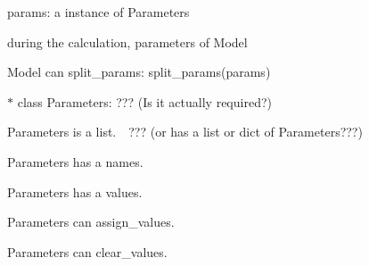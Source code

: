 \begin{DoxyItemize}
\begin{DoxyItemize}
\begin{DoxyItemize}
\begin{DoxyItemize}
\item params\+: a instance of {\ttfamily Parameters}
\begin{DoxyItemize}
\item during the calculation, parameters of Model
\end{DoxyItemize}
\end{DoxyItemize}
\end{DoxyItemize}
\item {\ttfamily Model} can {\ttfamily split\+\_\+params}\+: {\ttfamily split\+\_\+params(params)}
\end{DoxyItemize}
\item $\ast$ class {\ttfamily Parameters}\+: ??? (Is it actually required?)
\begin{DoxyItemize}
\item {\ttfamily Parameters} is a {\ttfamily list}.　??? (or has a {\ttfamily list} or {\ttfamily dict} of {\ttfamily Parameters}???)
\item {\ttfamily Parameters} has a {\ttfamily names}.
\item {\ttfamily Parameters} has a {\ttfamily values}.
\item {\ttfamily Parameters} can {\ttfamily assign\+\_\+values}.
\item {\ttfamily Parameters} can {\ttfamily clear\+\_\+values}.
\end{DoxyItemize}


\end{DoxyItemize}
